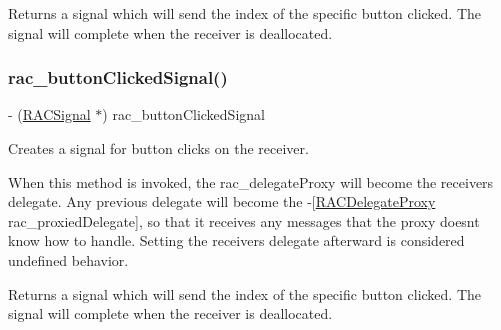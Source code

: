 Returns a signal which will send the index of the specific button clicked. The signal will complete when the receiver is deallocated. \mbox{\label{category_u_i_action_sheet_07_r_a_c_signal_support_08_a0b67dde5b07b850d24d70d030c80dd1b}} 
\subsubsection{\texorpdfstring{rac\+\_\+button\+Clicked\+Signal()}{rac\_buttonClickedSignal()}\hspace{0.1cm}{\footnotesize\ttfamily [2/3]}}
{\footnotesize\ttfamily -\/ (\mbox{\hyperlink{interface_r_a_c_signal}{R\+A\+C\+Signal}} $\ast$) rac\+\_\+button\+Clicked\+Signal \begin{DoxyParamCaption}{ }\end{DoxyParamCaption}}

Creates a signal for button clicks on the receiver.

When this method is invoked, the {\ttfamily rac\+\_\+delegate\+Proxy} will become the receiver\textquotesingle{}s delegate. Any previous delegate will become the -\/\mbox{[}\mbox{\hyperlink{interface_r_a_c_delegate_proxy}{R\+A\+C\+Delegate\+Proxy}} rac\+\_\+proxied\+Delegate\mbox{]}, so that it receives any messages that the proxy doesn\textquotesingle{}t know how to handle. Setting the receiver\textquotesingle{}s {\ttfamily delegate} afterward is considered undefined behavior.

Returns a signal which will send the index of the specific button clicked. The signal will complete when the receiver is deallocated. \mbox{\label{category_u_i_action_sheet_07_r_a_c_signal_support_08_a0b67dde5b07b850d24d70d030c80dd1b}} 
